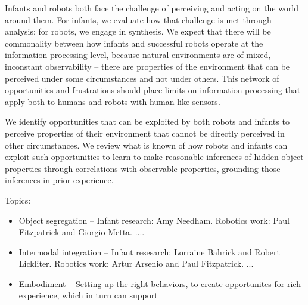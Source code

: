 
Infants and robots both face the challenge of perceiving and acting on
the world around them.  For infants, we evaluate how that challenge is
met through analysis; for robots, we engage in synthesis.  We expect
that there will be commonality between how infants and successful
robots operate at the information-processing level, because natural
environments are of mixed, inconstant observability -- there are
properties of the environment that can be perceived under some
circumstances and not under others.  This network of opportunities and
frustrations should place limits on information processing that apply
both to humans and robots with human-like sensors.

We identify opportunities that can be exploited by both robots and
infants to perceive properties of their environment that cannot be
directly perceived in other circumstances.  We review what is known of
how robots and infants can exploit such opportunities to learn to make
reasonable inferences of hidden object properties through correlations
with observable properties, grounding those inferences in prior
experience.

Topics:

\begin{itemize}

\item Object segregation --
  Infant research: Amy Needham.
  Robotics work: Paul Fitzpatrick and Giorgio Metta. ....

\item Intermodal integration --
  Infant resesarch: Lorraine Bahrick and Robert Lickliter.
  Robotics work: Artur Arsenio and Paul Fitzpatrick. ...

\item Embodiment -- 
  Setting up the right behaviors, to create opportunites
  for rich experience, which in turn can support 



\end{itemize}


